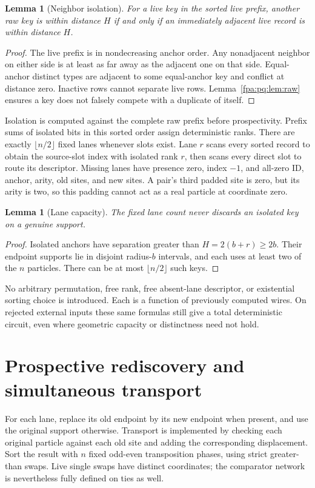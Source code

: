 \documentclass[11pt,a4paper]{article}
\numberwithin{equation}{section}
\newtheorem{lemma}[theorem]{Lemma}
\begin{document}
\begin{lemma}[Neighbor isolation]
For a live key in the sorted live prefix, another raw key is within distance $H$ if and only if an immediately adjacent live record is within distance $H$.
\end{lemma}
\begin{proof}
The live prefix is in nondecreasing anchor order. Any nonadjacent neighbor on either side is at least as far away as the adjacent one on that side. Equal-anchor distinct types are adjacent to some equal-anchor key and conflict at distance zero. Inactive rows cannot separate live rows. Lemma~\ref{fpa:pq:lem:raw} ensures a key does not falsely compete with a duplicate of itself.
\end{proof}
Isolation is computed against the complete raw prefix before prospectivity. Prefix sums of isolated bits in this sorted order assign deterministic ranks. There are exactly $\lfloor n/2\rfloor$ fixed lanes whenever slots exist. Lane $r$ scans every sorted record to obtain the source-slot index with isolated rank $r$, then scans every direct slot to route its descriptor. Missing lanes have presence zero, index $-1$, and all-zero ID, anchor, arity, old sites, and new sites. A pair's third padded site is zero, but its arity is two, so this padding cannot act as a real particle at coordinate zero.

\begin{lemma}[Lane capacity]
The fixed lane count never discards an isolated key on a genuine support.
\end{lemma}
\begin{proof}
Isolated anchors have separation greater than $H=2(b+r)\ge2b$. Their endpoint supports lie in disjoint radius-$b$ intervals, and each uses at least two of the $n$ particles. There can be at most $\lfloor n/2\rfloor$ such keys.
\end{proof}
No arbitrary permutation, free rank, free absent-lane descriptor, or existential sorting choice is introduced. Each is a function of previously computed wires. On rejected external inputs these same formulas still give a total deterministic circuit, even where geometric capacity or distinctness need not hold.

\section{Prospective rediscovery and simultaneous transport}
For each lane, replace its old endpoint by its new endpoint when present, and use the original support otherwise. Transport is implemented by checking each original particle against each old site and adding the corresponding displacement. Sort the result with $n$ fixed odd-even transposition phases, using strict greater-than swaps. Live single swaps have distinct coordinates; the comparator network is nevertheless fully defined on ties as well.
\end{document}
